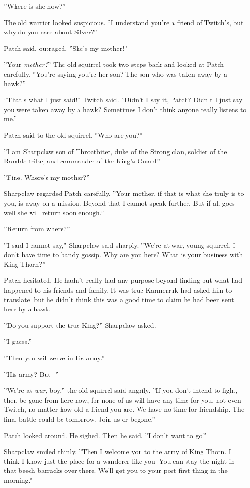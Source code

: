 \documentclass[12pt]{book}
\begin{document}
 ''Where is she now?''\par
 The old warrior looked suspicious. ''I understand you're a friend of Twitch's, but why do you care about Silver?''\par
 Patch said, outraged, ''She's my mother!''\par
 ''Your {\it mother?}'' The old squirrel took two steps back and looked at Patch carefully. ''You're saying you're her son? The son who was taken away by a hawk?''\par
 ''That's what I just said!'' Twitch said. ''Didn't I say it, Patch? Didn't I just say you were taken away by a hawk? Sometimes I don't think anyone really listens to me.''\par
 Patch said to the old squirrel, ''Who are you?''\par
 ''I am Sharpclaw son of Throatbiter, duke of the Strong clan, soldier of the Ramble tribe, and commander of the King's Guard.''\par
 ''Fine. Where's my mother?''\par
 Sharpclaw regarded Patch carefully. ''Your mother, if that is what she truly is to you, is away on a mission. Beyond that I cannot speak further. But if all goes well she will return soon enough.''\par
 ''Return from where?''\par
 ''I said I cannot say,'' Sharpclaw said sharply. ''We're at war, young squirrel. I don't have time to bandy gossip. Why are you here? What is your business with King Thorn?''\par
 Patch hesitated. He hadn't really had any purpose beyond finding out what had happened to his friends and family. It was true Karmerruk had asked him to translate, but he didn't think this was a good time to claim he had been sent here by a hawk.\par
 ''Do you support the true King?'' Sharpclaw asked.\par
 ''I guess.''\par
 ''Then you will serve in his army.''\par
 ''His army? But -''\par
 ''We're at {\it war}, boy,'' the old squirrel said angrily. ''If you don't intend to fight, then be gone from here now, for none of us will have any time for you, not even Twitch, no matter how old a friend you are. We have no time for friendship. The final battle could be tomorrow. Join us or begone.''\par
 Patch looked around. He sighed. Then he said, ''I don't want to go.''\par
 Sharpclaw smiled thinly. ''Then I welcome you to the army of King Thorn. I think I know just the place for a wanderer like you. You can stay the night in that beech barracks over there. We'll get you to your post first thing in the morning.''\par
\end{document}
